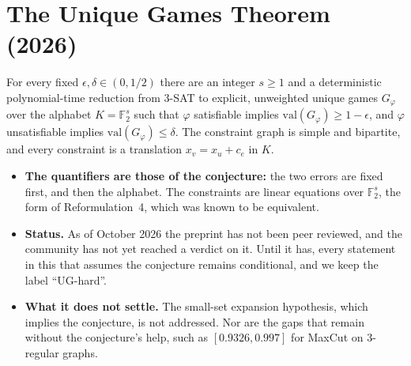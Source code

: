 \documentclass[handoutsbeamer.tex]{subfiles}
\begin{document}
\section{The Unique Games Theorem (2026)}\label{sec:ch03:ugt}

\begin{frame}
\onp{\footnotesize}
\begin{thm}\label{thm:ch03:ugt}
For every fixed $\epsilon,\delta\in(0,1/2)$ there are an integer $s\ge1$ and a deterministic polynomial-time reduction from 3-SAT to explicit, unweighted unique games $G_\varphi$ over the alphabet $K = \mathbb F_2^s$ such that $\varphi$ satisfiable implies $\mathrm{val}(G_\varphi)\ge1-\epsilon$, and $\varphi$ unsatisfiable implies $\mathrm{val}(G_\varphi)\le\delta$. The constraint graph is simple and bipartite, and every constraint is a translation $x_v = x_u + c_e$ in $K$.
\end{thm}
\begin{itemize}\setlength\itemsep{0.25em}
    \item \textbf{The quantifiers are those of the conjecture:} the two errors are fixed first, and then the alphabet. The constraints are linear equations over $\mathbb F_2^s$, the form of Reformulation~4, which was known to be equivalent.
    \item \textbf{Status.} As of October 2026 the preprint has not been peer reviewed, and the community has not yet reached a verdict on it. Until it has, every statement in this \chap{} that assumes the conjecture remains conditional, and we keep the label ``UG-hard''.
    \item \textbf{What it does not settle.} The small-set expansion hypothesis, which implies the conjecture, is not addressed. Nor are the gaps that remain without the conjecture's help, such as $[0.9326, 0.997]$ for MaxCut on 3-regular graphs.
\end{itemize}
\end{frame}
\end{document}
